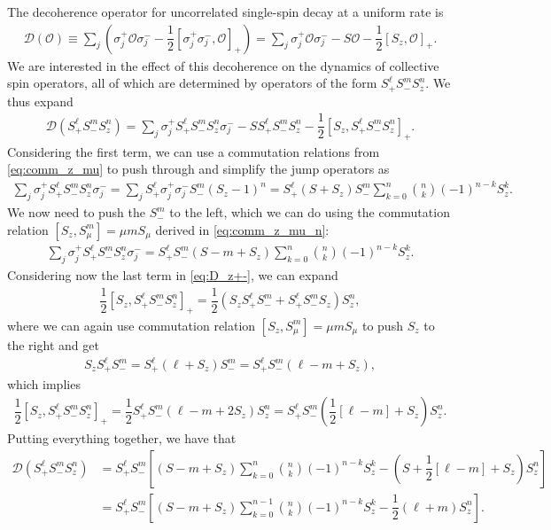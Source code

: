 \documentclass[aps,notitlepage,nofootinbib,11pt]{revtex4-1}
\newcommand{\f}[2]{\dfrac{#1}{#2}} %
\newcommand{\p}[1]{\left(#1\right)} %
\renewcommand{\sp}[1]{\left[#1\right]} %
\newcommand{\D}{\mathcal{D}}
\renewcommand{\O}{\mathcal{O}}
\newcommand{\1}{\mathds{1}}
\begin{document}
The decoherence operator for uncorrelated single-spin decay at a
uniform rate is
\begin{align}
  \D\p{\O}
  \equiv \sum_j\p{\sigma_j^+\O\sigma_j^-
    - \f12\sp{\sigma_j^+\sigma_j^-,\O}_+}
  = \sum_j \sigma_j^+\O\sigma_j^- - S \O - \f12 \sp{S_z,\O}_+.
\end{align}
We are interested in the effect of this decoherence on the dynamics of
collective spin operators, all of which are determined by operators of
the form $S_+^\ell S_-^m S_z^n$.  We thus expand
\begin{align}
  \D\p{S_+^\ell S_-^m S_z^n}
  = \sum_j \sigma_j^+ S_+^\ell S_-^m S_z^n \sigma_j^-
  - S S_+^\ell S_-^m S_z^n - \f12 \sp{S_z, S_+^\ell S_-^m S_z^n}_+.
  \label{eq:D_z+-}
\end{align}
Considering the first term, we can use a commutation relations from
\eqref{eq:comm_z_mu} to push through and simplify the jump operators
as
\begin{align}
  \sum_j \sigma_j^+ S_+^\ell S_-^m S_z^n \sigma_j^-
  = \sum_j S_+^\ell \sigma_j^+ \sigma_j^- S_-^m \p{S_z-1}^n
  = S_+^\ell \p{S + S_z} S_-^m
  \sum_{k=0}^n { n \choose k } \p{-1}^{n-k} S_z^k.
\end{align}
We now need to push the $S_-^m$ to the left, which we can do using the
commutation relation $\sp{S_z,S_\mu^m}=\mu mS_\mu$ derived in
\eqref{eq:comm_z_mu_n}:
\begin{align}
  \sum_j \sigma_j^+ S_+^\ell S_-^m S_z^n \sigma_j^-
  = S_+^\ell S_-^m \p{S - m + S_z}
  \sum_{k=0}^n { n \choose k } \p{-1}^{n-k} S_z^k.
\end{align}
Considering now the last term in \eqref{eq:D_z+-}, we can expand
\begin{align}
  \f12 \sp{S_z, S_+^\ell S_-^m S_z^n}_+
  = \f12 \p{S_z S_+^\ell S_-^m + S_+^\ell S_-^m S_z} S_z^n,
\end{align}
where we can again use commutation relation
$\sp{S_z,S_\mu^m}=\mu mS_\mu$ to push $S_z$ to the right and get
\begin{align}
  S_z S_+^\ell S_-^m
  = S_+^\ell \p{\ell + S_z} S_-^m
  = S_+^\ell S_-^m \p{\ell - m + S_z},
\end{align}
which implies
\begin{align}
  \f12 \sp{S_z, S_+^\ell S_-^m S_z^n}_+
  = \f12 S_+^\ell S_-^m \p{\ell - m + 2 S_z} S_z^n
  = S_+^\ell S_-^m \p{\f12\sp{\ell-m} + S_z} S_z^n.
\end{align}
Putting everything together, we have that
\begin{align}
  \D\p{S_+^\ell S_-^m S_z^n}
  &= S_+^\ell S_-^m \sp{\p{S - m + S_z} \sum_{k=0}^n
    { n \choose k } \p{-1}^{n-k} S_z^k
    - \p{S + \f12\sp{\ell-m} + S_z} S_z^n} \\
  &= S_+^\ell S_-^m \sp{\p{S - m + S_z} \sum_{k=0}^{n-1}
    { n \choose k } \p{-1}^{n-k} S_z^k - \f12 \p{\ell+m} S_z^n}.
\end{align}
\end{document}
